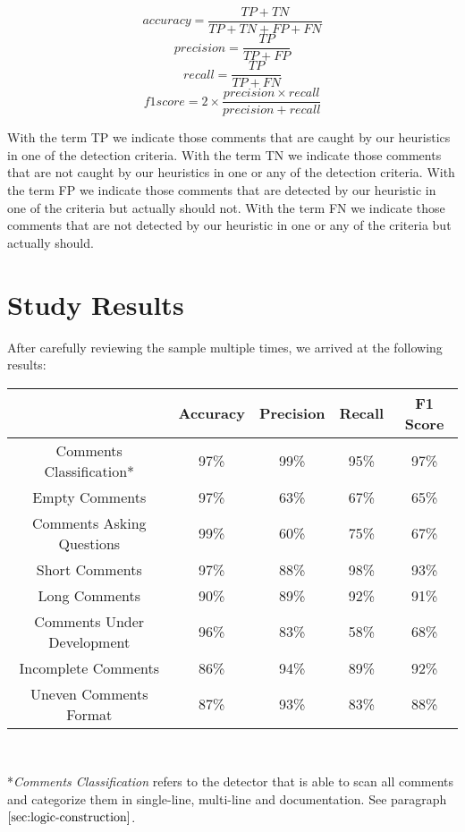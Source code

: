 \begin{equation*}
	accuracy = \frac{TP + TN}{TP + TN + FP + FN}		
\end{equation*}
\begin{equation*}
	precision = \frac{TP}{TP + FP}
\end{equation*}
\begin{equation*}
	recall = \frac{TP}{TP + FN}
\end{equation*}
\begin{equation*}
	f1score = 2 \times \frac{precision \times recall}{precision + recall}
\end{equation*}

\noindent With the term TP we indicate those comments that are caught by our heuristics in one of the detection criteria. With the term TN we indicate those comments that are not caught by our heuristics in one or any of the detection criteria. With the term FP we indicate those comments that are detected by our heuristic in one of the criteria but actually should not. With the term FN we indicate those comments that are not detected by our heuristic in one or any of the criteria but actually should.

\section{Study Results}
After carefully reviewing the sample multiple times, we arrived at the following results:

\begin{center}
	\begin{tabular}{|c|c|c|c|c|}
		\hline
		& \textbf{Accuracy} & \textbf{Precision} & \textbf{Recall} & \textbf{F1 Score} \\
		\hline Comments Classification*    & 97\%     & 99\%      & 95\%   & 97\%    \\
		\hline Empty Comments             & 97\%     & 63\%      & 67\%   & 65\%    \\
		\hline Comments Asking Questions  & 99\%     & 60\%      & 75\%   & 67\%    \\
		\hline Short Comments             & 97\%     & 88\%      & 98\%   & 93\%    \\
		\hline Long Comments              & 90\%     & 89\%      & 92\%   & 91\%    \\
		\hline Comments Under Development & 96\%     & 83\%      & 58\%   & 68\%    \\
		\hline Incomplete Comments        & 86\%     & 94\%      & 89\%   & 92\%    \\
		\hline Uneven Comments Format     & 87\%     & 93\%      & 83\%   & 88\%   \\
		\hline
	\end{tabular}
	
	\textit{\\}
	
	*\textit{Comments Classification} refers to the detector that is able to scan all comments and categorize them in single-line, multi-line and documentation. See paragraph $\ref{sec:logic-construction}$.
\end{center}

